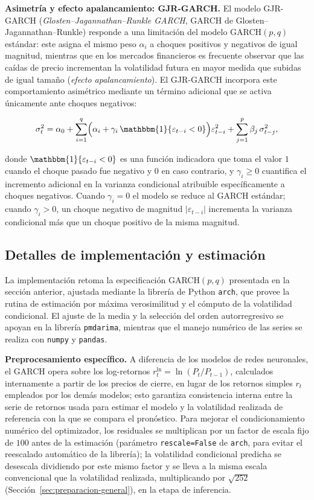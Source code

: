 \documentclass[12pt]{paper}
\begin{document}
\noindent\textbf{Asimetría y efecto apalancamiento: GJR-GARCH.}
El modelo GJR-GARCH (\textit{Glosten--Jagannathan--Runkle GARCH}, GARCH de Glosten--Jagannathan--Runkle) \citep{glosten1993gjr} responde a una limitación del modelo GARCH$(p,q)$ estándar: este asigna el mismo peso $\alpha_i$ a choques positivos y negativos de igual magnitud, mientras que en los mercados financieros es frecuente observar que las caídas de precio incrementan la volatilidad futura en mayor medida que subidas de igual tamaño (\emph{efecto apalancamiento}). El GJR-GARCH incorpora este comportamiento asimétrico mediante un término adicional que se activa únicamente ante choques negativos:

\begin{equation}
    \sigma_t^2 = \alpha_0 + \sum_{i=1}^{q}\Bigl(\alpha_i + \gamma_i\,\mathbbm{1}\{\varepsilon_{t-i}<0\}\Bigr)\varepsilon_{t-i}^2 + \sum_{j=1}^{p}\beta_j\,\sigma_{t-j}^2,
\end{equation}

donde $\mathbbm{1}\{\varepsilon_{t-i}<0\}$ es una función indicadora que toma el valor $1$ cuando el choque pasado fue negativo y $0$ en caso contrario, y $\gamma_i \geq 0$ cuantifica el incremento adicional en la varianza condicional atribuible específicamente a choques negativos. Cuando $\gamma_i = 0$ el modelo se reduce al GARCH estándar; cuando $\gamma_i > 0$, un choque negativo de magnitud $|\varepsilon_{t-i}|$ incrementa la varianza condicional más que un choque positivo de la misma magnitud.


\subsection{Detalles de implementación y estimación}

La implementación retoma la especificación GARCH$(p,q)$ presentada en la sección anterior, ajustada mediante la librería de Python \texttt{arch}, que provee la rutina de estimación por máxima verosimilitud y el cómputo de la volatilidad condicional. El ajuste de la media y la selección del orden autorregresivo se apoyan en la librería \texttt{pmdarima}, mientras que el manejo numérico de las series se realiza con \texttt{numpy} y \texttt{pandas}.

\textbf{Preprocesamiento específico.} A diferencia de los modelos de redes neuronales, el GARCH opera sobre los log-retornos $r_t^{\ln} = \ln(P_t/P_{t-1})$, calculados internamente a partir de los precios de cierre, en lugar de los retornos simples $r_t$ empleados por los demás modelos; esto garantiza consistencia interna entre la serie de retornos usada para estimar el modelo y la volatilidad realizada de referencia con la que se compara el pronóstico. Para mejorar el condicionamiento numérico del optimizador, los residuales se multiplican por un factor de escala fijo de $100$ antes de la estimación (parámetro \texttt{rescale=False} de \texttt{arch}, para evitar el reescalado automático de la librería); la volatilidad condicional predicha se desescala dividiendo por este mismo factor y se lleva a la misma escala convencional que la volatilidad realizada, multiplicando por $\sqrt{252}$ (Sección~\ref{sec:preparacion-general}), en la etapa de inferencia.
\end{document}
